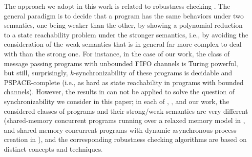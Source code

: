 The approach we adopt in this work is related to robustness checking \cite{DBLP:conf/se/BouajjaniDM14,DBLP:conf/esop/BouajjaniEEOT17}. The general paradigm is to decide that a program has the same behaviors under two semantics, one being weaker than the other, by showing a polynomial reduction to a state reachability problem under the stronger semantics, i.e., by avoiding the consideration of the weak semantics that is in general far more complex to deal with than the strong one. For instance, in the case of our work, the class of message passing programs with unbounded FIFO channels is Turing powerful, but still, surprisingly, $k$-synchronizability of these programs is decidable and PSPACE-complete (i.e., as hard as state reachability in programs with bounded channels). However, the results in \cite{DBLP:conf/se/BouajjaniDM14,DBLP:conf/esop/BouajjaniEEOT17} can not be applied to solve the question of synchronizability we consider in this paper; in each of \cite{DBLP:conf/se/BouajjaniDM14}, \cite{DBLP:conf/esop/BouajjaniEEOT17}, and our work, the considered classes of programs and their strong/weak semantics are very different (shared-memory concurrent programs running over a relaxed memory model in \cite{DBLP:conf/se/BouajjaniDM14}, and shared-memory concurrent programs with dynamic asynchronous process creation in \cite{DBLP:conf/esop/BouajjaniEEOT17}), and the corresponding robustness checking algorithms are based on distinct concepts and techniques. 

